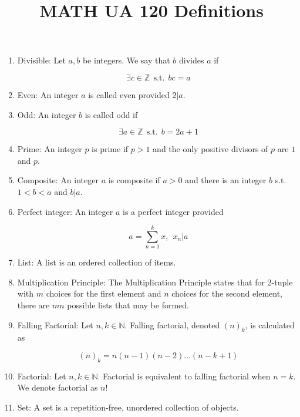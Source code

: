 \documentclass{article}
\title{MATH UA 120 Definitions}
\date{}
\begin{document}
\maketitle

\begin{enumerate}
    \item Divisible: Let $a,b$ be integers. We say that $b$ divides $a$ if 

    \[\exists c\in\mathbb{Z}\:\: \text{s.t.} \:\: bc=a\]

    \item Even: An integer $a$ is called even provided $2|a$.
    
    \item Odd: An integer $b$ is called odd if
    
    \[\exists a\in\mathbb{Z} \:\: \text{s.t.} \:\: b=2a+1\]
    
    \item Prime: An integer $p$ is prime if $p>1$ and the only positive divisors of $p$ are $1$ and $p$.
    
    \item Composite: An integer $a$ is composite if $a>0$ and there is an integer $b$ s.t. $1<b<a$ and $b|a$.
    
    \item Perfect integer: An integer $a$ is a perfect integer provided 
    
    \[a=\sum_{n=1}^k x,\:\: x_n|a\]
    
    \item List: A list is an ordered collection of items.
    
    \item Multiplication Principle: The Multiplication Principle states that for 2-tuple with $m$ choices for the first element and $n$ choices for the second element, there are $mn$ possible lists that may be formed.
    
    \item Falling Factorial: Let $n,k\in\mathbb{N}$. Falling factorial, denoted $(n)_k$, is calculated as
    
    \[(n)_k=n(n-1)(n-2)\dots(n-k+1)\]
    
    \item Factorial: Let $n,k\in\mathbb{N}$. Factorial is equivalent to falling factorial when $n=k$. We denote factorial as $n!$
    
    \item Set: A set is a repetition-free, unordered collection of objects.
    

\end{enumerate}
\end{document}
